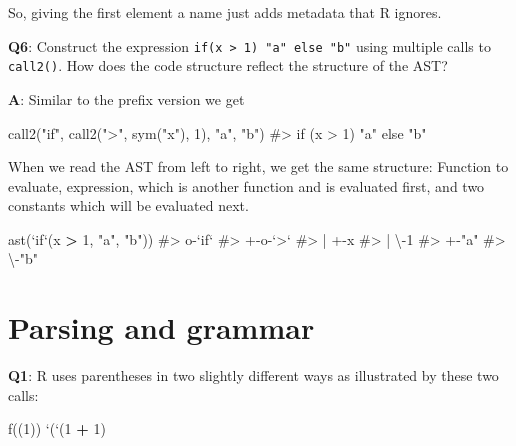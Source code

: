 \documentclass[
]{krantz}
\makeatletter
\newenvironment{Shaded}{\begin{snugshade}}{\end{snugshade}}
\newcommand{\CommentTok}[1]{\textcolor[rgb]{0.56,0.35,0.01}{\textit{#1}}}
\newcommand{\DataTypeTok}[1]{\textcolor[rgb]{0.13,0.29,0.53}{#1}}
\newcommand{\DecValTok}[1]{\textcolor[rgb]{0.00,0.00,0.81}{#1}}
\newcommand{\KeywordTok}[1]{\textcolor[rgb]{0.13,0.29,0.53}{\textbf{#1}}}
\newcommand{\NormalTok}[1]{#1}
\newcommand{\OperatorTok}[1]{\textcolor[rgb]{0.81,0.36,0.00}{\textbf{#1}}}
\newcommand{\StringTok}[1]{\textcolor[rgb]{0.31,0.60,0.02}{#1}}
\newenvironment{kframe}{%
\medskip{}
\setlength{\fboxsep}{.8em}
 \def\at@end@of@kframe{}%
 \ifinner\ifhmode%
  \def\at@end@of@kframe{\end{minipage}}%
  \begin{minipage}{\columnwidth}%
 \fi\fi%
 \def\FrameCommand##1{\hskip\@totalleftmargin \hskip-\fboxsep
 \colorbox{shadecolor}{##1}\hskip-\fboxsep
     \hskip-\linewidth \hskip-\@totalleftmargin \hskip\columnwidth}%
 \MakeFramed {\advance\hsize-\width
   \@totalleftmargin\z@ \linewidth\hsize
   \@setminipage}}%
 {\par\unskip\endMakeFramed%
 \at@end@of@kframe}
\renewenvironment{Shaded}{\begin{kframe}}{\end{kframe}}
\renewcommand{\KeywordTok} [1]{\textcolor[rgb]{0.00,0.44,0.13}{{#1}}}
\renewcommand{\DataTypeTok}[1]{\textcolor[rgb]{0.56,0.13,0.00}{{#1}}}
\renewcommand{\DecValTok}  [1]{\textcolor[rgb]{0.25,0.63,0.44}{{#1}}}
\renewcommand{\StringTok}  [1]{\textcolor[rgb]{0.25,0.44,0.63}{{#1}}}
\renewcommand{\CommentTok} [1]{\textcolor[rgb]{0.38,0.63,0.69}{{#1}}}
\renewcommand{\NormalTok}  [1]{{#1}}
\makeatother
\begin{document}
So, giving the first element a name just adds metadata that R ignores.

\textbf{{Q6}}: Construct the expression \texttt{if(x\ \textgreater{}\ 1)\ "a"\ else\ "b"} using multiple calls to \texttt{call2()}. How does the code structure reflect the structure of the AST?

\textbf{{A}}: Similar to the prefix version we get

\begin{Shaded}
\begin{Highlighting}[]
\KeywordTok{call2}\NormalTok{(}\StringTok{"if"}\NormalTok{, }\KeywordTok{call2}\NormalTok{(}\StringTok{">"}\NormalTok{, }\KeywordTok{sym}\NormalTok{(}\StringTok{"x"}\NormalTok{), }\DecValTok{1}\NormalTok{), }\StringTok{"a"}\NormalTok{, }\StringTok{"b"}\NormalTok{)}
\CommentTok{#> if (x > 1) "a" else "b"}
\end{Highlighting}
\end{Shaded}

When we read the AST from left to right, we get the same structure: Function to evaluate, expression, which is another function and is evaluated first, and two constants which will be evaluated next.

\begin{Shaded}
\begin{Highlighting}[]
\KeywordTok{ast}\NormalTok{(}\StringTok{`}\DataTypeTok{if}\StringTok{`}\NormalTok{(x }\OperatorTok{>}\StringTok{ }\DecValTok{1}\NormalTok{, }\StringTok{"a"}\NormalTok{, }\StringTok{"b"}\NormalTok{))}
\CommentTok{#> o-`if` }
\CommentTok{#> +-o-`>` }
\CommentTok{#> | +-x }
\CommentTok{#> | \textbackslash{}-1 }
\CommentTok{#> +-"a" }
\CommentTok{#> \textbackslash{}-"b"}
\end{Highlighting}
\end{Shaded}

\hypertarget{parsing-and-grammar}{%
\section{Parsing and grammar}\label{parsing-and-grammar}}

\textbf{{Q1}}: R uses parentheses in two slightly different ways as illustrated by these two calls:

\begin{Shaded}
\begin{Highlighting}[]
\KeywordTok{f}\NormalTok{((}\DecValTok{1}\NormalTok{))}
\StringTok{`}\DataTypeTok{(}\StringTok{`}\NormalTok{(}\DecValTok{1} \OperatorTok{+}\StringTok{ }\DecValTok{1}\NormalTok{)}
\end{Highlighting}
\end{Shaded}
\end{document}
